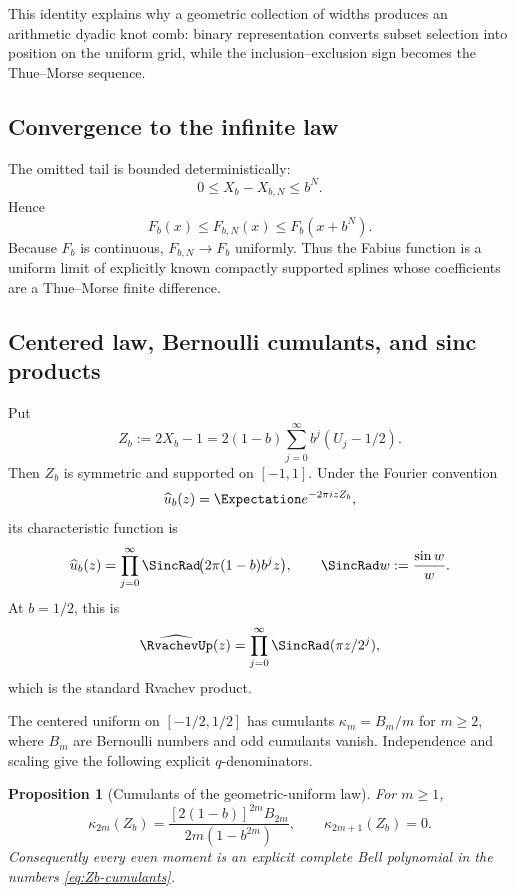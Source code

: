 \documentclass[11pt,oneside]{article}
\numberwithin{equation}{section}
\newtheorem{proposition}[proposition]{Proposition}
\theoremstyle{definition}
\theoremstyle{remark}
\begin{document}
This identity explains why a geometric collection of widths produces an
arithmetic dyadic knot comb: binary representation converts subset selection
into position on the uniform grid, while the inclusion--exclusion sign becomes
the Thue--Morse sequence.

\subsection{Convergence to the infinite law}

The omitted tail is bounded deterministically:
\[
 0\le X_b-X_{b,N}\le b^N.
\]
Hence
\begin{equation}
 F_b(x)\le F_{b,N}(x)\le F_b(x+b^N).
 \label{eq:CDF-sandwich}
\end{equation}
Because $F_b$ is continuous, $F_{b,N}\to F_b$ uniformly.  Thus the Fabius
function is a uniform limit of explicitly known compactly supported splines
whose coefficients are a Thue--Morse finite difference.

\subsection{Centered law, Bernoulli cumulants, and sinc products}

Put
\begin{equation}
 Z_b:=2X_b-1
 =2(1-b)\sum_{j=0}^{\infty}b^j(U_j-1/2).
 \label{eq:Zb}
\end{equation}
Then $Z_b$ is symmetric and supported on $[-1,1]$.  Under the Fourier
convention
\[
 \widehat u_b(z)=\Expectation e^{-2\pi izZ_b},
\]
its characteristic function is
\begin{equation}
 \widehat u_b(z)
 =\prod_{j=0}^{\infty}
 \SincRad\!\bigl(2\pi(1-b)b^jz\bigr),
 \qquad \SincRad w:=\frac{\sin w}{w}.
 \label{eq:generic-sinc-product}
\end{equation}
At $b=1/2$, this is
\begin{equation}
 \widehat\RvachevUp(z)=\prod_{j=0}^{\infty}\SincRad(\pi z/2^j),
 \label{eq:up-sinc}
\end{equation}
which is the standard Rvachev product.

The centered uniform on $[-1/2,1/2]$ has cumulants
$\kappa_m=B_m/m$ for $m\ge2$, where $B_m$ are Bernoulli numbers and odd
cumulants vanish.  Independence and scaling give the following explicit
$q$-denominators.

\begin{proposition}[Cumulants of the geometric-uniform law]
For $m\ge1$,
\begin{equation}
 \kappa_{2m}(Z_b)
 =\frac{[2(1-b)]^{2m}B_{2m}}
 {2m(1-b^{2m})},
 \qquad \kappa_{2m+1}(Z_b)=0.
 \label{eq:Zb-cumulants}
\end{equation}
Consequently every even moment is an explicit complete Bell polynomial in the
numbers \eqref{eq:Zb-cumulants}.
\end{proposition}
\end{document}
